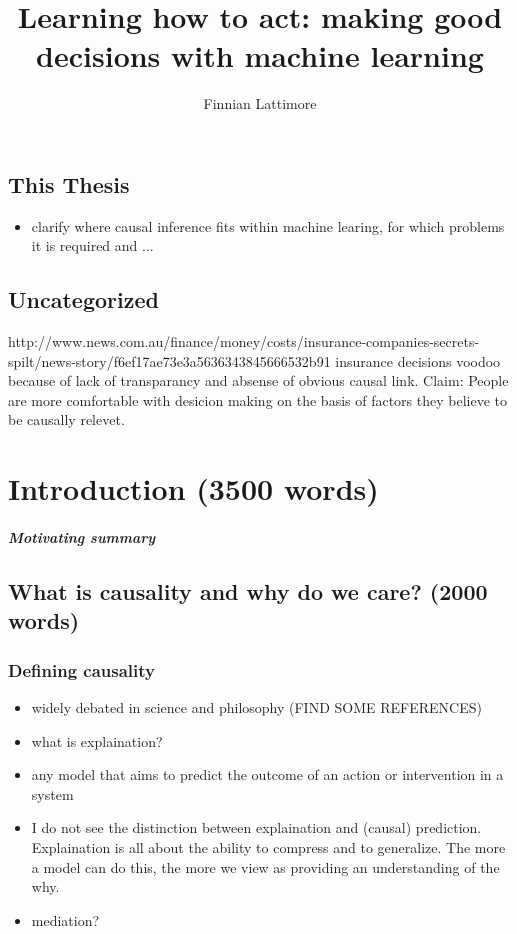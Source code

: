 \documentclass[11pt,a4paper]{book}
\author{Finnian Lattimore}
\title{Learning how to act: making good decisions with machine learning}
\begin{document}
\def\ci{\perp\!\!\!\perp} %
\newtheorem{theorem}{Theorem}[section]
\newtheorem{definition}{Definition}[section]
\maketitle

\section{This Thesis}
\begin{itemize}
\item clarify where causal inference fits within machine learing, for which problems it is required and ...
\end{itemize}

\section*{Uncategorized}
http://www.news.com.au/finance/money/costs/insurance-companies-secrets-spilt/news-story/f6ef17ae73e3a5636343845666532b91 insurance decisions voodoo because of lack of transparancy and absense of obvious causal link. Claim: People are more comfortable with desicion making on the basis of factors they believe to be causally relevet.

\chapter*{Introduction (3500 words)}

\paragraph*{Motivating summary}

\section*{What is causality and why do we care? (2000 words)}

\subsection*{Defining causality}
\begin{itemize}
\item widely debated in science and philosophy (FIND SOME REFERENCES)
\item what is explaination?
\item any model that aims to predict the outcome of an action or intervention in a system
\item I do not see the distinction between explaination and (causal) prediction. Explaination is all about the ability to compress and to generalize. The more a model can do this, the more we view as providing an understanding of the why. 
\item mediation?
\end{itemize}
\end{document}

